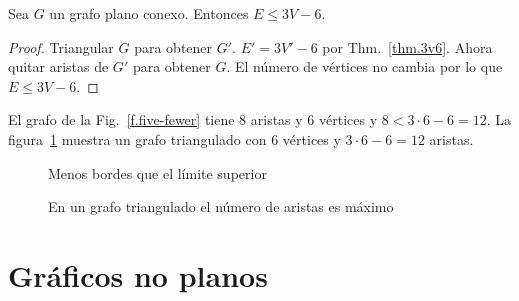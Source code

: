 {{\begin{theorem}\label{thm.count}
Sea $G$ un grafo plano conexo. Entonces $E\leq 3V-6$.
\end{theorem}

\begin{proof}
Triangular $G$ para obtener $G'$. $E'= 3V'-6$ por Thm.~\ref{thm.3v6}. Ahora quitar aristas de $G'$ para obtener $G$. El número de vértices no cambia por lo que $E\leq 3V-6$.
\end{proof}

\begin{example}
El grafo de la Fig.~\ref{f.five-fewer} tiene $8$ aristas y $6$ vértices y $8< 3\cdot 6 - 6= 12$.
La figura~\ref{f.five-upper-limit} muestra un grafo triangulado con $6$ vértices y $3\cdot 6 - 6= 12$ aristas.
\end{example}

\begin{figure}[t]
\begin{minipage}{.4\textwidth}
\begin{center}
\caption{Menos bordes que el límite superior}\label{f.five-fewer}
\end{center}
\end{minipage}
\hfill
\begin{minipage}{.55\textwidth}
\begin{center}
\caption{En un grafo triangulado el número de aristas es máximo}\label{f.five-upper-limit}
\end{center}
\end{minipage}
\end{figure}


\section{Gráficos no planos}\label{s.nonplanar}

}}
